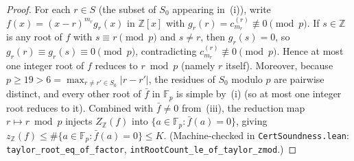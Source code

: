 \documentclass[11pt]{article}
\newcommand{\Z}{\mathbb{Z}}
\newcommand{\F}{\mathbb{F}}
\newcommand{\code}[1]{\texttt{#1}}
\newcommand{\zZ}{z_{\Z}}
\begin{document}
\begin{proof}
For each $r \in S$ (the subset of $S_0$ appearing in~(i)), write $f(x) = (x - r)^{m_r} g_r(x)$ in $\Z[x]$ with $g_r(r) = c_{m_r}^{(r)} \not\equiv 0 \pmod p$. If $s \in \Z$ is any root of $f$ with $s \equiv r \pmod p$ and $s \neq r$, then $g_r(s) = 0$, so $g_r(r) \equiv g_r(s) \equiv 0 \pmod p$, contradicting $c_{m_r}^{(r)} \not\equiv 0 \pmod p$. Hence at most one integer root of $f$ reduces to $r \bmod p$ (namely $r$ itself). Moreover, because $p \ge 19 > 6 = \max_{r \neq r' \in S_0} |r - r'|$, the residues of $S_0$ modulo $p$ are pairwise distinct, and every other root of $\bar{f}$ in $\F_p$ is simple by~(i) (so at most one integer root reduces to it). Combined with $\bar{f} \neq 0$ from~(iii), the reduction map $r \mapsto r \bmod p$ injects $Z_{\Z}(f)$ into $\{a \in \F_p : \bar{f}(a) = 0\}$, giving $\zZ(f) \le \#\{a \in \F_p : \bar{f}(a) = 0\} \le K$. (Machine-checked in \code{CertSoundness.lean}: \code{taylor\_root\_eq\_of\_factor}, \code{intRootCount\_le\_of\_taylor\_zmod}.)
\end{proof}
\end{document}
